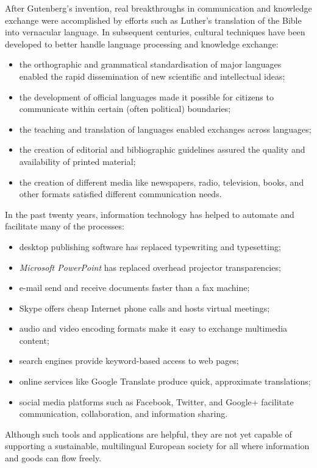 \begin{multicols}{2}
\begin{itemize}
\begin{multicols}{2}

    After Gutenberg’s invention, real breakthroughs in communication and knowledge exchange were accomplished by efforts such as Luther’s translation of the Bible into vernacular language. In subsequent centuries, cultural techniques have been developed to better handle language processing and knowledge exchange:
    \begin{itemize}
      \item the orthographic and grammatical standardisation of major languages enabled the rapid dissemination of new 
      scientific and intellectual ideas;
      \item the development of official languages made it possible for citizens to communicate within certain (often 
      political) boundaries;
      \item the teaching and translation of languages enabled exchanges across languages;
      \item the creation of editorial and bibliographic guidelines assured the quality and availability of printed 
      material;
      \item the creation of different media like newspapers, radio, television, books, and other formats satisfied 
      different communication needs. 
    \end{itemize}
    In the past twenty years, information technology has helped to automate and facilitate many of the processes:
    \begin{itemize}
      \item desktop publishing software has replaced typewriting and typesetting;
      \item \textit{Microsoft PowerPoint} has replaced overhead projector transparencies;
      \item e-mail send and receive documents faster than a fax machine;
      \item Skype offers cheap Internet phone calls and hosts virtual meetings;
      \item audio and video encoding formats make it easy to exchange multimedia content;
      \item search engines provide keyword-based access to web pages;
      \item online services like Google Translate produce quick, approximate translations;
      \item social media platforms such as Facebook, Twitter, and Google+ facilitate communication, collaboration, and information sharing.
    \end{itemize}
    Although such tools and applications are helpful, they are not yet capable of supporting a sustainable, multilingual European society for all where information and goods can flow freely.


\end{multicols}
\end{itemize}
\end{multicols}
